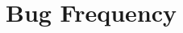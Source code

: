 \chapter{Bug Frequency}\label{c:freqlist}
\begin{singlespace}
\begin{sidetable}

\end{sidetable}
\end{singlespace}
